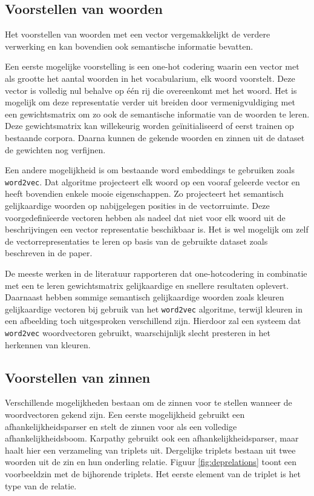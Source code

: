\subsection{Voorstellen van woorden}
 Het voorstellen van woorden met een vector vergemakkelijkt de verdere verwerking en kan bovendien ook semantische informatie bevatten.

 Een eerste mogelijke voorstelling is een one-hot codering waarin een vector met als grootte het aantal woorden in het vocabularium, elk woord voorstelt. Deze vector is volledig nul behalve op \'e\'en rij die overeenkomt met het woord. Het is mogelijk om deze representatie verder uit breiden door vermenigvuldiging met een gewichtsmatrix om zo ook de semantische informatie van de woorden te leren. Deze gewichtsmatrix kan willekeurig worden ge\"initialiseerd of eerst trainen op bestaande corpora\cite{Lebret2013,Mao2014a,Google}. Daarna kunnen de gekende woorden en zinnen uit de dataset de gewichten nog verfijnen.  

 Een andere mogelijkheid is om bestaande word embeddings te gebruiken zoals \texttt{word2vec}. Dat algoritme projecteert elk woord op een vooraf geleerde vector en heeft bovendien enkele mooie eigenschappen. Zo projecteert het semantisch gelijkaardige woorden op nabijgelegen posities in de vectorruimte\cite{Mikolov2013}. Deze voorgedefin\"ieerde vectoren hebben als nadeel dat niet voor elk woord uit de beschrijvingen een vector representatie beschikbaar is. Het is wel mogelijk om zelf de vectorrepresentaties te leren op basis van de gebruikte dataset zoals beschreven in de paper.

 De meeste werken in de literatuur rapporteren dat one-hotcodering in combinatie met een te leren gewichtsmatrix gelijkaardige en snellere resultaten oplevert. Daarnaast hebben sommige semantisch gelijkaardige woorden zoals kleuren gelijkaardige vectoren bij gebruik van het \texttt{word2vec} algoritme, terwijl kleuren in een afbeelding toch uitgesproken verschillend zijn. Hierdoor zal een systeem dat \texttt{word2vec} woordvectoren gebruikt, waarschijnlijk slecht presteren in het herkennen van kleuren\cite{Karpathy2015}.
 
\subsection{Voorstellen van zinnen}
 Verschillende mogelijkheden bestaan om de zinnen voor te stellen wanneer de woordvectoren gekend zijn. Een eerste mogelijkheid gebruikt een afhankelijkheidsparser en stelt de zinnen voor als een volledige afhankelijkheidsboom\cite{Socher2014}. Karpathy\cite{Karpathy2014} gebruikt ook een afhankelijkheidsparser, maar haalt hier een verzameling van triplets uit. Dergelijke triplets bestaan uit twee woorden uit de zin en hun onderling relatie. Figuur \ref{fig:deprelations} toont een voorbeeldzin met de bijhorende triplets. Het eerste element van de triplet is het type van de relatie.


